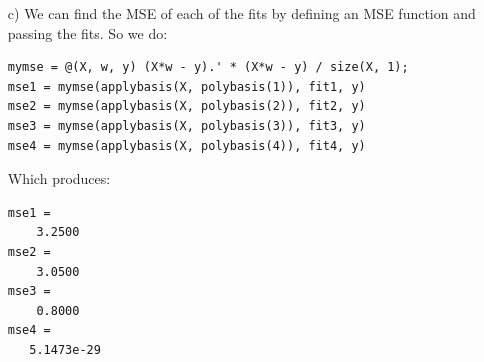 \documentclass[11pt]{article}
\begin{document}
\begin{itemize}
    \item[c)] We can find the MSE of each of the fits by defining an MSE function and passing the fits. So we do:
        \begin{lstlisting}
mymse = @(X, w, y) (X*w - y).' * (X*w - y) / size(X, 1);
mse1 = mymse(applybasis(X, polybasis(1)), fit1, y)
mse2 = mymse(applybasis(X, polybasis(2)), fit2, y)
mse3 = mymse(applybasis(X, polybasis(3)), fit3, y)
mse4 = mymse(applybasis(X, polybasis(4)), fit4, y)
        \end{lstlisting}
        Which produces:
        \begin{lstlisting}
mse1 =
    3.2500
mse2 =
    3.0500
mse3 =
    0.8000
mse4 =
   5.1473e-29
        \end{lstlisting}       
        
\end{itemize}
\end{document}
